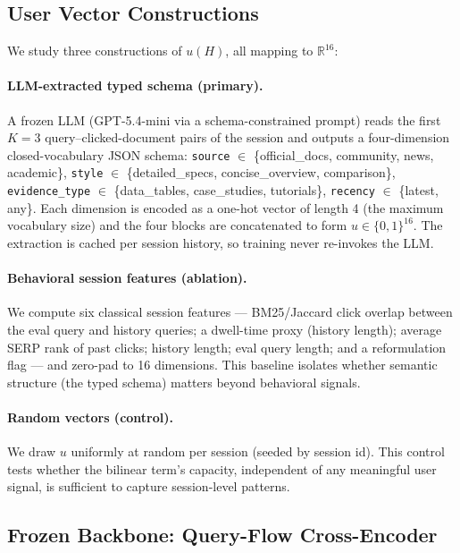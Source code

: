 \subsection{User Vector Constructions}
\label{sec:method:uservec}

We study three constructions of $u(H)$, all mapping to $\mathbb{R}^{16}$:

\paragraph{LLM-extracted typed schema (primary).}
A frozen LLM (GPT-5.4-mini via a schema-constrained prompt) reads the first $K=3$ query--clicked-document pairs of the session and outputs a four-dimension closed-vocabulary JSON schema:
\texttt{source} $\in$ \{official\_docs, community, news, academic\},
\texttt{style} $\in$ \{detailed\_specs, concise\_overview, comparison\},
\texttt{evidence\_type} $\in$ \{data\_tables, case\_studies, tutorials\},
\texttt{recency} $\in$ \{latest, any\}.
Each dimension is encoded as a one-hot vector of length 4 (the maximum vocabulary size) and the four blocks are concatenated to form $u \in \{0,1\}^{16}$. The extraction is cached per session history, so training never re-invokes the LLM.

\paragraph{Behavioral session features (ablation).}
We compute six classical session features --- BM25/Jaccard click overlap between the eval query and history queries; a dwell-time proxy (history length); average SERP rank of past clicks; history length; eval query length; and a reformulation flag --- and zero-pad to 16 dimensions. This baseline isolates whether semantic structure (the typed schema) matters beyond behavioral signals.

\paragraph{Random vectors (control).}
We draw $u$ uniformly at random per session (seeded by session id). This control tests whether the bilinear term's capacity, independent of any meaningful user signal, is sufficient to capture session-level patterns.

\subsection{Frozen Backbone: Query-Flow Cross-Encoder}
\label{sec:method:backbone}

